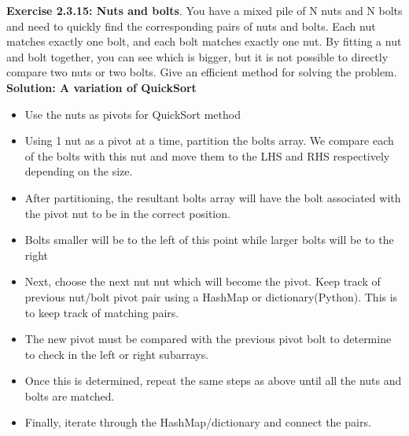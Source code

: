 \documentclass[11pt,fleqn]{article}
\begin{document}
\textbf{Exercise 2.3.15: Nuts and bolts}. You have a mixed pile of N nuts and N bolts
and need to quickly find the corresponding pairs of nuts and bolts. Each nut matches
exactly one bolt, and each bolt matches exactly one nut. By fitting a nut and bolt together,
you can see which is bigger, but it is not possible to directly compare two nuts or
two bolts. Give an efficient method for solving the problem.\\

\textbf{Solution: A variation of QuickSort}

\begin{itemize}
	\item Use the nuts as pivots for QuickSort method
	\item Using 1 nut as a pivot at a time, partition the bolts array. We compare each of the bolts with this nut and move them to the LHS and RHS respectively depending on the size.
	\item After partitioning, the resultant bolts array will have the bolt associated with the pivot nut to be in the correct position.
	\item Bolts smaller will be to the left of this point while larger bolts will be to the right
	\item Next, choose the next nut nut which will become the pivot. Keep track of previous nut/bolt pivot pair using a HashMap or dictionary(Python). This is to keep track of matching pairs.
	\item The new pivot must be compared with the previous pivot bolt to determine to check in the left or right subarrays.
	\item Once this is determined, repeat the same steps as above until all the nuts and bolts are matched.
	\item Finally, iterate through the HashMap/dictionary and connect the pairs.
\end{itemize}
\end{document}
